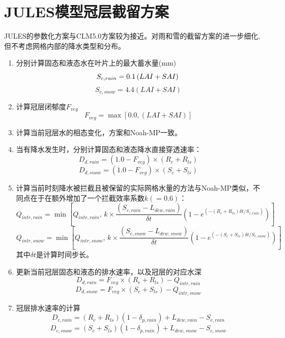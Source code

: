 \section{JULES模型冠层截留方案}
JULES的参数化方案与CLM5.0方案较为接近。对雨和雪的截留方案的进一步细化,但不考虑网格内部的降水类型和分布。
\begin{enumerate}
\item 分别计算固态和液态水在叶片上的最大蓄水量(mm)\\
\begin{equation}
S_{c,rain}=0.1\left(LAI+SAI\right)\\
\end{equation}
\begin{equation}
S_{c,snow}=4.4\left(LAI+SAI\right)
\end{equation}
\item 计算冠层闭郁度$F_{veg}$
\begin{equation}
F_{veg} = \max\left[0.0,\left(LAI+SAI\right)\right]
\end{equation}

\item 计算当前冠层水的相态变化，方案和Noah-MP一致。

\item 当有降水发生时，分别计算固态和液态降水直接穿透速率：
\begin{equation}
D_{d,rain}=\left(1.0-F_{veg}\right) \times (R_{c}+R_{ls})
\end{equation}
\begin{equation}
D_{d,snow}=\left(1.0-F_{veg}\right) \times (S_{c}+S_{ls})
\end{equation}
\item 计算当前时刻降水被拦截且被保留的实际网格水量的方法与Noah-MP类似，不同点在于在额外增加了一个拦截效率系数$k(=0.6)$：
\begin{equation}
Q_{intr,rain} = \min\left[Q_{intr,rain},\,  k \times \frac{(S_{c,rain} - L_{dew,rain})}{\delta{t}} \left(1-e^{(-\left(R_{c}+R_{ls}\right)\delta{t}/S_{c,rain})}\right)\right]
\end{equation}
\begin{equation}
Q_{intr,snow} = \min\left[Q_{intr,snow},\, k \times \frac{(S_{c,snow} - L_{dew,snow})}{\delta{t}}\left(1-e^{(-\left(S_{c}+S_{ls}\right)\delta{t}/S_{c,snow})}\right)\right]
\end{equation}
其中${\delta{t}}$是计算时间步长。
\item 更新当前冠层固态和液态的排水速率，以及冠层的对应水深
\begin{equation}
D_{d,rain}=F_{veg} \times (R_{c}+R_{ls})-Q_{intr,rain}
\end{equation}
\begin{equation}
D_{d,snow}=F_{veg} \times (S_{c}+S_{ls})-Q_{intr,snow}
\end{equation}
\item 冠层排水速率的计算
\begin{equation}
D_{c,rain}=\left(R_{c}+R_{ls}\right)\left(1-\delta_{p,rain}\right)+L_{dew,rain}-S_{c,rain}
\end{equation}
\begin{equation}
D_{c,snow}=\left(S_{c}+S_{ls}\right)\left(1-\delta_{p,rain}\right)+L_{dew,snow}-S_{c,snow}
\end{equation}

\end{enumerate}






